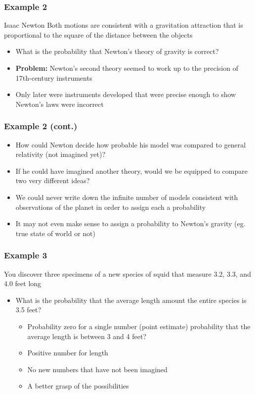 \documentclass[12pt, block=fill]{beamer}
\begin{document}
\begin{frame}
  \frametitle{Example 2}
  \begin{exampleblock}{Isaac Newton}
    Both motions are consistent with a gravitation attraction that is proportional to the square of the distance between the objects
  \end{exampleblock}
    \begin{itemize}
        \item What is the probability that Newton's theory of gravity is correct?
        \item \textbf{Problem:} Newton's second theory seemed to work up to the precision of 17th-century instruments
        \item Only later were instruments developed that were precise enough to show Newton's laws were incorrect
    \end{itemize}
    
\end{frame}


\begin{frame}
  \frametitle{Example 2 (cont.)}

  \begin{itemize}

    \item How could Newton decide how probable his model was compared to general relativity (not imagined yet)?
    \item If he could have imagined another theory, would we be equipped to compare two very different ideas?
     \item We could never write down the infinite number of models consistent with observations of the planet in order to assign each a probability
    \item It may not even make sense to assign a probability to Newton's gravity (eg. true state of world or not)
  \end{itemize}
\end{frame}



\begin{frame}
  \frametitle{Example 3}
  You discover three specimens of a new species of squid that measure 3.2, 3.3, and 4.0 feet long
  \begin{itemize}
  \item What is the probability that the average length amount the entire species is 3.5 feet?
  
    \begin{itemize}
      \item Probability zero for a single number (point estimate)
  probability that the average length is between 3 and 4 feet?
        \item Positive number for length
        \item No new numbers that have not been imagined
        \item A better grasp of the possibilities
    \end{itemize}
    
  \end{itemize}
\end{frame}
\end{document}
